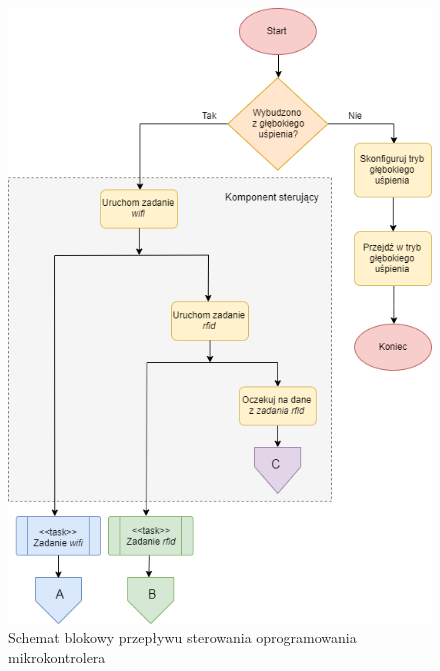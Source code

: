             \begin{figure}[]
                \centering
                \includegraphics[width=\textwidth]{chapters/images/flowchart1.png}
                \caption{Schemat blokowy przepływu sterowania oprogramowania mikrokontrolera}
                \label{fig:flowchart1}
            \end{figure}

